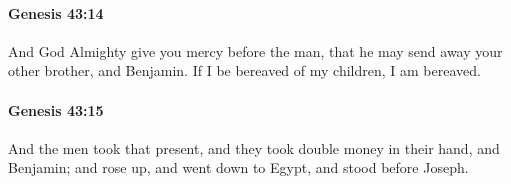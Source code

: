 		\paragraph{Genesis 43:14} %
			\label{GENESIS-43-14}

			And God Almighty give you mercy before the man, that he may send away your other brother, and Benjamin. If I be bereaved of my children, I am bereaved.


		\paragraph{Genesis 43:15} %
			\label{GENESIS-43-15}

			And the men took that present, and they took double money in their hand, and Benjamin; and rose up, and went down to Egypt, and stood before Joseph.



